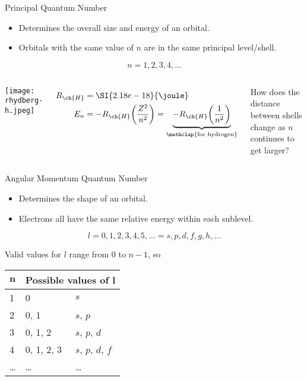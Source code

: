 \documentclass[notes=hide]{beamer}
\begin{document}
\begin{frame}{Principal Quantum Number}
	\begin{itemize}
		\item Determines the overall \alert{size} and \alert{energy} of an orbital.
		\item Orbitals with the same value of $n$ are in the \alert{same}
			principal level/shell.
	\end{itemize}

	\begin{equation*}
		n = 1, 2, 3, 4, \ldots
	\end{equation*}

	\begin{columns}
		\begin{center}
		\texttt{[image: rhydberg-h.jpeg]}
		\end{center}
		\begin{align*}
			R_{\ch{H}} &= \SI{2.18e-18}{\joule} \\
			E_n &= -R_{\ch{H}}\bigg(\frac{Z^2}{n^2}\bigg)
			=
			\underbrace{-R_{\ch{H}}\bigg(\frac{1}{n^2}\bigg)}_{\mathclap{\text{for
			hydrogen}}}
		\end{align*}

		\pause

		How does the distance between shells change as $n$ continues to
		get larger?
	\end{columns}
\end{frame}

\begin{frame}{Angular Momentum Quantum Number}
	\begin{itemize}
		\item Determines the \alert{shape} of an orbital.
		\item Electrons all have the same relative energy within each
			\alert{sublevel}.
	\end{itemize}
	\begin{equation*}
		l = 0, 1, 2, 3, 4, 5, \ldots =
		s, p, d, f, g, h, \ldots
	\end{equation*}

	Valid values for $l$ range from 0 to $n-1$, so
	\begin{center}
		\begin{tabular} {l l l}
			\toprule\bfseries $\bm{n}$ &
			\multicolumn{2}{l}{\bfseries Possible values
			of $\bm{l}$} \\
		\midrule
			1 & 0          & $s$ \\
			2 & 0, 1       & $s$, $p$ \\
			3 & 0, 1, 2    & $s$, $p$, $d$ \\
			4 & 0, 1, 2, 3 & $s$, $p$, $d$, $f$ \\
			\ldots & \ldots & \ldots \\ \bottomrule
	\end{tabular}
	\end{center}
\end{frame}
\end{document}
